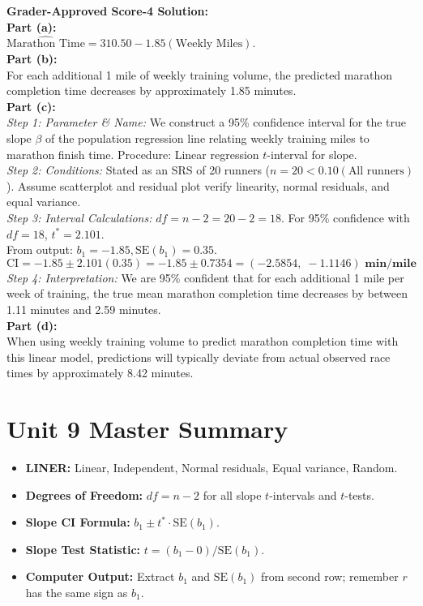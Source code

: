 \begin{frqrubricbox}
\textbf{Grader-Approved Score-4 Solution:}\\
\textbf{Part (a):}\\
$\widehat{\text{Marathon Time}} = 310.50 - 1.85(\text{Weekly Miles})$.\\
\textbf{Part (b):}\\
For each additional 1 mile of weekly training volume, the predicted marathon completion time decreases by approximately 1.85 minutes.\\
\textbf{Part (c):}\\
\textit{Step 1: Parameter \& Name:} We construct a 95\% confidence interval for the true slope $\beta$ of the population regression line relating weekly training miles to marathon finish time. Procedure: Linear regression $t$-interval for slope.\\
\textit{Step 2: Conditions:} Stated as an SRS of 20 runners ($n = 20 < 0.10(\text{All runners})$). Assume scatterplot and residual plot verify linearity, normal residuals, and equal variance.\\
\textit{Step 3: Interval Calculations:} $df = n - 2 = 20 - 2 = 18$. For 95\% confidence with $df = 18$, $t^* = 2.101$.\\
From output: $b_1 = -1.85, \text{SE}(b_1) = 0.35$.\\
\[ \text{CI} = -1.85 \pm 2.101(0.35) = -1.85 \pm 0.7354 = \mathbf{(-2.5854, \; -1.1146)\text{ min/mile}} \]
\textit{Step 4: Interpretation:} We are 95\% confident that for each additional 1 mile per week of training, the true mean marathon completion time decreases by between 1.11 minutes and 2.59 minutes.\\
\textbf{Part (d):}\\
When using weekly training volume to predict marathon completion time with this linear model, predictions will typically deviate from actual observed race times by approximately 8.42 minutes.
\end{frqrubricbox}

\section{Unit 9 Master Summary}
\begin{lessonbox}
\begin{itemize}[leftmargin=1.2em]
  \item \textbf{LINER:} Linear, Independent, Normal residuals, Equal variance, Random.
  \item \textbf{Degrees of Freedom:} $df = n - 2$ for all slope $t$-intervals and $t$-tests.
  \item \textbf{Slope CI Formula:} $b_1 \pm t^* \cdot \text{SE}(b_1)$.
  \item \textbf{Slope Test Statistic:} $t = (b_1 - 0)/\text{SE}(b_1)$.
  \item \textbf{Computer Output:} Extract $b_1$ and $\text{SE}(b_1)$ from second row; remember $r$ has the same sign as $b_1$.
\end{itemize}
\end{lessonbox}
\clearpage
